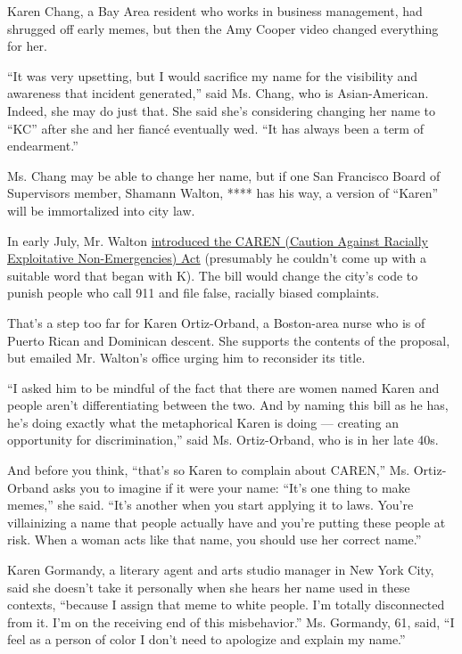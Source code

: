 Karen Chang, a Bay Area resident who works in business management, had
shrugged off early memes, but then the Amy Cooper video changed
everything for her.

``It was very upsetting, but I would sacrifice my name for the
visibility and awareness that incident generated,'' said Ms. Chang, who
is Asian-American. Indeed, she may do just that. She said she's
considering changing her name to ``KC'' after she and her fiancé
eventually wed. ``It has always been a term of endearment.''

Ms. Chang may be able to change her name, but if one San Francisco Board
of Supervisors member, Shamann Walton, **** has his way, a version of
``Karen'' will be immortalized into city law.

In early July, Mr. Walton
\href{https://www.nytimes3xbfgragh.onion/2020/07/24/briefing/caren-act-911-san-francisco.html}{introduced
the CAREN (Caution Against Racially Exploitative Non-Emergencies) Act}
(presumably he couldn't come up with a suitable word that began with K).
The bill would change the city's code to punish people who call 911 and
file false, racially biased complaints.

That's a step too far for Karen Ortiz-Orband, a Boston-area nurse who is
of Puerto Rican and Dominican descent. She supports the contents of the
proposal, but emailed Mr. Walton's office urging him to reconsider its
title.

``I asked him to be mindful of the fact that there are women named Karen
and people aren't differentiating between the two. And by naming this
bill as he has, he's doing exactly what the metaphorical Karen is doing
--- creating an opportunity for discrimination,'' said Ms. Ortiz-Orband,
who is in her late 40s.

And before you think, ``that's so Karen to complain about CAREN,'' Ms.
Ortiz-Orband asks you to imagine if it were your name: ``It's one thing
to make memes,'' she said. ``It's another when you start applying it to
laws. You're villainizing a name that people actually have and you're
putting these people at risk. When a woman acts like that name, you
should use her correct name.''

Karen Gormandy, a literary agent and arts studio manager in New York
City, said she doesn't take it personally when she hears her name used
in these contexts, ``because I assign that meme to white people. I'm
totally disconnected from it. I'm on the receiving end of this
misbehavior.'' Ms. Gormandy, 61, said, ``I feel as a person of color I
don't need to apologize and explain my name.''


